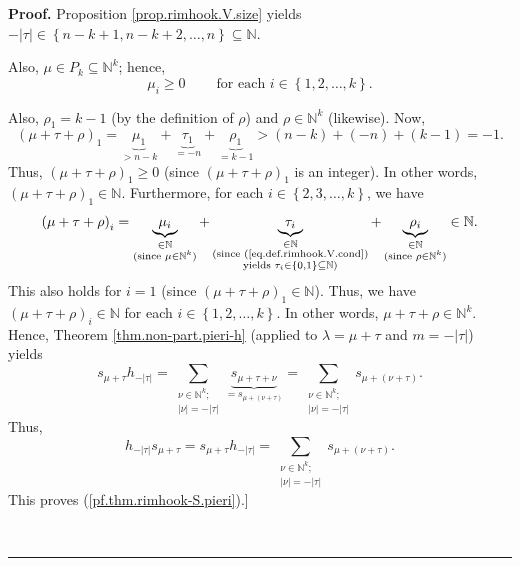 \documentclass[numbers=enddot,12pt,final,onecolumn,notitlepage]{scrartcl}%
\theoremstyle{definition}
\newenvironment{proof}[1][Proof]{\noindent\textbf{#1.} }{\ \rule{0.5em}{0.5em}}
\let\sumnonlimits\sum
\renewcommand{\sum}{\sumnonlimits\limits}
\begin{document}
\begin{proof}
Proposition \ref{prop.rimhook.V.size} yields $-\left\vert \tau\right\vert
\in\left\{  n-k+1,n-k+2,\ldots,n\right\}  \subseteq\mathbb{N}$.

Also, $\mu\in P_{k}\subseteq\mathbb{N}^{k}$; hence,
\begin{equation}
\mu_{i}\geq0\ \ \ \ \ \ \ \ \ \ \text{for each }i\in\left\{  1,2,\ldots
,k\right\}  . \label{pf.thm.rimhook-S.pieri.pf.1}%
\end{equation}


Also, $\rho_{1}=k-1$ (by the definition of $\rho$) and $\rho\in\mathbb{N}^{k}$
(likewise). Now,%
\[
\left(  \mu+\tau+\rho\right)  _{1}=\underbrace{\mu_{1}}_{>n-k}%
+\underbrace{\tau_{1}}_{=-n}+\underbrace{\rho_{1}}_{=k-1}>\left(  n-k\right)
+\left(  -n\right)  +\left(  k-1\right)  =-1.
\]
Thus, $\left(  \mu+\tau+\rho\right)  _{1}\geq0$ (since $\left(  \mu+\tau
+\rho\right)  _{1}$ is an integer). In other words, $\left(  \mu+\tau
+\rho\right)  _{1}\in\mathbb{N}$. Furthermore, for each $i\in\left\{
2,3,\ldots,k\right\}  $, we have%
\[
\left(  \mu+\tau+\rho\right)  _{i}=\underbrace{\mu_{i}}_{\substack{\in
\mathbb{N}\\\text{(since }\mu\in\mathbb{N}^{k}\text{)}}}+\underbrace{\tau_{i}%
}_{\substack{\in\mathbb{N}\\\text{(since (\ref{eq.def.rimhook.V.cond}%
)}\\\text{yields }\tau_{i}\in\left\{  0,1\right\}  \subseteq\mathbb{N}%
\text{)}}}+\underbrace{\rho_{i}}_{\substack{\in\mathbb{N}\\\text{(since }%
\rho\in\mathbb{N}^{k}\text{)}}}\in\mathbb{N}.
\]
This also holds for $i=1$ (since $\left(  \mu+\tau+\rho\right)  _{1}%
\in\mathbb{N}$). Thus, we have $\left(  \mu+\tau+\rho\right)  _{i}%
\in\mathbb{N}$ for each $i\in\left\{  1,2,\ldots,k\right\}  $. In other words,
$\mu+\tau+\rho\in\mathbb{N}^{k}$. Hence, Theorem \ref{thm.non-part.pieri-h}
(applied to $\lambda=\mu+\tau$ and $m=-\left\vert \tau\right\vert $) yields%
\[
s_{\mu+\tau}h_{-\left\vert \tau\right\vert }=\sum_{\substack{\nu\in
\mathbb{N}^{k};\\\left\vert \nu\right\vert =-\left\vert \tau\right\vert
}}\underbrace{s_{\mu+\tau+\nu}}_{=s_{\mu+\left(  \nu+\tau\right)  }}%
=\sum_{\substack{\nu\in\mathbb{N}^{k};\\\left\vert \nu\right\vert =-\left\vert
\tau\right\vert }}s_{\mu+\left(  \nu+\tau\right)  }.
\]
Thus,
\[
h_{-\left\vert \tau\right\vert }s_{\mu+\tau}=s_{\mu+\tau}h_{-\left\vert
\tau\right\vert }=\sum_{\substack{\nu\in\mathbb{N}^{k};\\\left\vert
\nu\right\vert =-\left\vert \tau\right\vert }}s_{\mu+\left(  \nu+\tau\right)
}.
\]
This proves (\ref{pf.thm.rimhook-S.pieri}).]


\end{proof}
\end{document}
